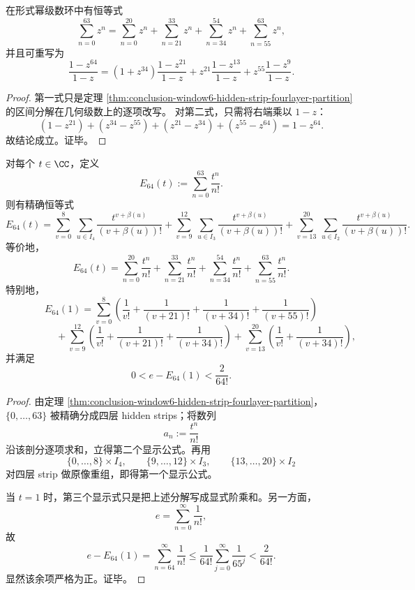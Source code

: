 \begin{corollary}\label{cor:conclusion-window6-dyadic-geometric-series-hidden-strip-telescope}
在形式幂级数环中有恒等式
\[
\sum_{n=0}^{63}z^n
=
\sum_{n=0}^{20}z^n
+\sum_{n=21}^{33}z^n
+\sum_{n=34}^{54}z^n
+\sum_{n=55}^{63}z^n,
\]
并且可重写为
\[
\frac{1-z^{64}}{1-z}
=
(1+z^{34})\frac{1-z^{21}}{1-z}
+z^{21}\frac{1-z^{13}}{1-z}
+z^{55}\frac{1-z^{9}}{1-z}.
\]
\end{corollary}
\begin{proof}
第一式只是定理 \ref{thm:conclusion-window6-hidden-strip-fourlayer-partition} 的区间分解在几何级数上的逐项改写。
对第二式，只需将右端乘以 \(1-z\)：
\[
(1-z^{21})+(z^{34}-z^{55})+(z^{21}-z^{34})+(z^{55}-z^{64})
=
1-z^{64}.
\]
故结论成立。证毕。
\end{proof}

\begin{theorem}\label{thm:conclusion-window6-e64-finite-borel-partition}
对每个 \(t\in\CC\)，定义
\[
E_{64}(t):=\sum_{n=0}^{63}\frac{t^n}{n!}.
\]
则有精确恒等式
\[
E_{64}(t)
=
\sum_{v=0}^{8}\ \sum_{u\in I_4}\frac{t^{v+\beta(u)}}{(v+\beta(u))!}
+\sum_{v=9}^{12}\ \sum_{u\in I_3}\frac{t^{v+\beta(u)}}{(v+\beta(u))!}
+\sum_{v=13}^{20}\ \sum_{u\in I_2}\frac{t^{v+\beta(u)}}{(v+\beta(u))!}.
\]
等价地，
\[
E_{64}(t)
=
\sum_{n=0}^{20}\frac{t^n}{n!}
+\sum_{n=21}^{33}\frac{t^n}{n!}
+\sum_{n=34}^{54}\frac{t^n}{n!}
+\sum_{n=55}^{63}\frac{t^n}{n!}.
\]
特别地，
\[
E_{64}(1)
=
\sum_{v=0}^{8}
\left(
\frac1{v!}+\frac1{(v+21)!}+\frac1{(v+34)!}+\frac1{(v+55)!}
\right)
\]
\[
\phantom{E_{64}(1)=}
+\sum_{v=9}^{12}
\left(
\frac1{v!}+\frac1{(v+21)!}+\frac1{(v+34)!}
\right)
+\sum_{v=13}^{20}
\left(
\frac1{v!}+\frac1{(v+34)!}
\right),
\]
并满足
\[
0<e-E_{64}(1)<\frac{2}{64!}.
\]
\end{theorem}
\begin{proof}
由定理 \ref{thm:conclusion-window6-hidden-strip-fourlayer-partition}，\(\{0,\dots,63\}\) 被精确分成四层 hidden strips；将数列
\[
a_n:=\frac{t^n}{n!}
\]
沿该剖分逐项求和，立得第二个显示公式。再用
\[
\{0,\dots,8\}\times I_4,\qquad
\{9,\dots,12\}\times I_3,\qquad
\{13,\dots,20\}\times I_2
\]
对四层 strip 做原像重组，即得第一个显示公式。

当 \(t=1\) 时，第三个显示式只是把上述分解写成显式阶乘和。另一方面，
\[
e=\sum_{n=0}^{\infty}\frac1{n!},
\]
故
\[
e-E_{64}(1)=\sum_{n=64}^{\infty}\frac1{n!}
\le
\frac1{64!}\sum_{j=0}^{\infty}\frac1{65^j}
<
\frac{2}{64!}.
\]
显然该余项严格为正。证毕。
\end{proof}
